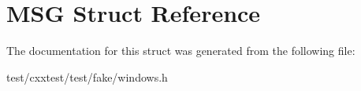 \hypertarget{structMSG}{\section{M\-S\-G Struct Reference}
\label{structMSG}
}


The documentation for this struct was generated from the following file\-:\begin{DoxyCompactItemize}
\item 
test/cxxtest/test/fake/windows.\-h\end{DoxyCompactItemize}
